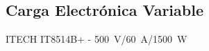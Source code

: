 \subsection{Carga Electrónica Variable}

{\Medium ITECH IT8514B+} - \SI[]{500}[]{\volt}/\SI[]{60}[]{\ampere}/\SI[]{1500}[]{\watt}